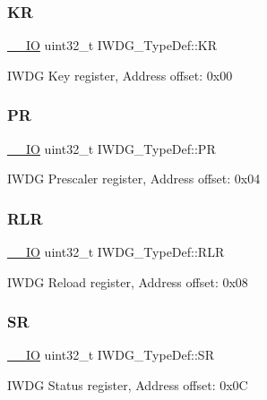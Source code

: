 \subsubsection{\texorpdfstring{KR}{KR}}
{\footnotesize\ttfamily \mbox{\hyperlink{core__sc300_8h_aec43007d9998a0a0e01faede4133d6be}{\+\_\+\+\_\+\+IO}} uint32\+\_\+t I\+W\+D\+G\+\_\+\+Type\+Def\+::\+KR}

I\+W\+DG Key register, Address offset\+: 0x00 \mbox{\label{struct_i_w_d_g___type_def_a5f2717885ff171e686e0347af9e6b68d}} 
\subsubsection{\texorpdfstring{PR}{PR}}
{\footnotesize\ttfamily \mbox{\hyperlink{core__sc300_8h_aec43007d9998a0a0e01faede4133d6be}{\+\_\+\+\_\+\+IO}} uint32\+\_\+t I\+W\+D\+G\+\_\+\+Type\+Def\+::\+PR}

I\+W\+DG Prescaler register, Address offset\+: 0x04 \mbox{\label{struct_i_w_d_g___type_def_aa3703eaa40e447dcacc69c0827595532}} 
\subsubsection{\texorpdfstring{RLR}{RLR}}
{\footnotesize\ttfamily \mbox{\hyperlink{core__sc300_8h_aec43007d9998a0a0e01faede4133d6be}{\+\_\+\+\_\+\+IO}} uint32\+\_\+t I\+W\+D\+G\+\_\+\+Type\+Def\+::\+R\+LR}

I\+W\+DG Reload register, Address offset\+: 0x08 \mbox{\label{struct_i_w_d_g___type_def_a9bbfbe921f2acfaf58251849bd0a511c}} 
\subsubsection{\texorpdfstring{SR}{SR}}
{\footnotesize\ttfamily \mbox{\hyperlink{core__sc300_8h_aec43007d9998a0a0e01faede4133d6be}{\+\_\+\+\_\+\+IO}} uint32\+\_\+t I\+W\+D\+G\+\_\+\+Type\+Def\+::\+SR}

I\+W\+DG Status register, Address offset\+: 0x0C \mbox{\label{struct_i_w_d_g___type_def_a88aff7f1de0043ecf1667bd40b8c99d1}} 
